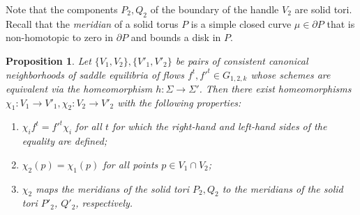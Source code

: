 \documentclass[%
 aip,
 amsmath,amssymb,
preprint,%
]{revtex4-1}
\newtheorem{propos}{Proposition}
\begin{document}
Note that the components $P_2, Q_2$ of the boundary of the handle $V_2$ are solid tori. Recall that the {\it meridian} of a solid torus $P$ is a simple closed curve $\mu\in \partial P$ that is non-homotopic to zero in $\partial P$ and bounds a disk in $P$.

\begin{propos}\label{local_conj}
Let $\{V_1,V_2\}, \{V'_1, V'_2\}$ be pairs of consistent canonical neighborhoods of saddle equilibria of flows $f^t, {f'}^t\in G_{1,2,k}$ whose schemes are equivalent via the homeomorphism $h:\Sigma\to \Sigma'$. Then there exist homeomorphisms $\chi_{1}: V_{1}\to V'_{1}, \chi_{2}: V_{2}\to V'_{2}$ with the following properties:

\begin{enumerate}
\item $\chi_{i}f^t={f'}^t\chi_{i}$ for all $t$ for which the right-hand and left-hand sides of the equality are defined;
\item $\chi_2(p)=\chi_1(p)$ for all points $p\in V_1\cap V_2$;
\item $\chi_{2}$ maps the meridians of the solid tori $P_2, Q_2$ to the meridians of the solid tori $P'_2$, $Q'_2$, respectively.
\end{enumerate}
\end{propos}
\end{document}
